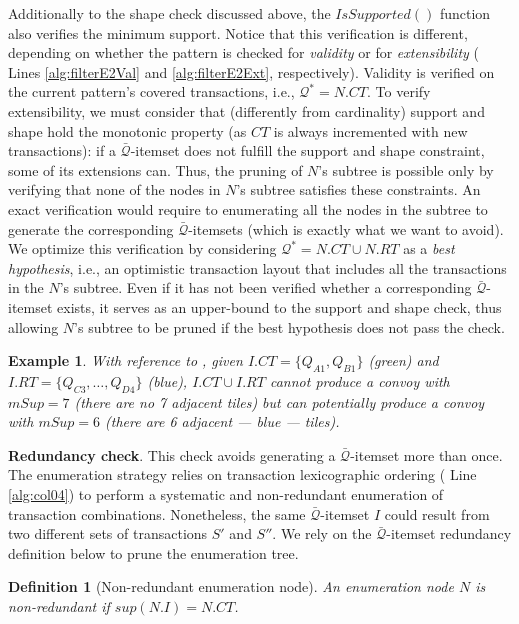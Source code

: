 \documentclass[preprint,12pt,authoryear]{elsarticle} %
\newtheorem{example}{Example}
\newtheorem{definition}{Definition}
\begin{document}
Additionally to the shape check discussed above, the $IsSupported()$ function also verifies the minimum support.
Notice that this verification is different, depending on whether the pattern is checked for \textit{validity} or for \textit{extensibility} ( Lines \ref{alg:filterE2Val} and \ref{alg:filterE2Ext}, respectively).
Validity is verified on the current pattern's covered transactions, i.e., $\mathcal{Q}^* = N.CT$.
To verify extensibility, we must consider that (differently from cardinality) support and shape hold the monotonic property (as $CT$ is always incremented with new transactions): if a $\bar{\mathcal{Q}}$-itemset does not fulfill the support and shape constraint, some of its extensions can.
Thus, the pruning of $N$'s subtree is possible only by verifying that none of the nodes in $N$'s subtree satisfies these constraints.
An exact verification would require to enumerating all the nodes in the subtree to generate the corresponding $\bar{\mathcal{Q}}$-itemsets (which is exactly what we want to avoid).
We optimize this verification by considering $\mathcal{Q}^* = N.CT \cup N.RT$ as a \textit{best hypothesis}, i.e., an optimistic transaction layout that includes all the transactions in the $N$'s subtree.
Even if it has not been verified whether a corresponding $\bar{\mathcal{Q}}$-itemset exists, it serves as an upper-bound to the support and shape check, thus allowing $N$'s subtree to be pruned if the best hypothesis does not pass the check.

\begin{example}
With reference to , given $I.CT=\{Q_{A1},Q_{B1}\}$ (green) and $I.RT=\{Q_{C3},\ldots,Q_{D4}\}$ (blue), $I.CT \cup I.RT$ cannot produce a convoy with $mSup=7$ (there are no 7 adjacent tiles) but can potentially produce a convoy with $mSup=6$ (there are 6 adjacent --- blue --- tiles).
\end{example}

\textbf{Redundancy check}.
This check avoids generating a $\bar{\mathcal{Q}}$-itemset more than once.
The enumeration strategy relies on transaction lexicographic ordering ( Line \ref{alg:col04}) to perform a systematic and non-redundant enumeration of transaction combinations.
Nonetheless, the same $\bar{\mathcal{Q}}$-itemset $I$ could result from two different sets of transactions $S'$ and $S''$.
We rely on the $\bar{\mathcal{Q}}$-itemset redundancy definition below to prune the enumeration tree.

\begin{definition}[Non-redundant enumeration node]
An enumeration node $N$ is non-redundant if $sup(N.I) = N.CT$.
\end{definition}
\end{document}
